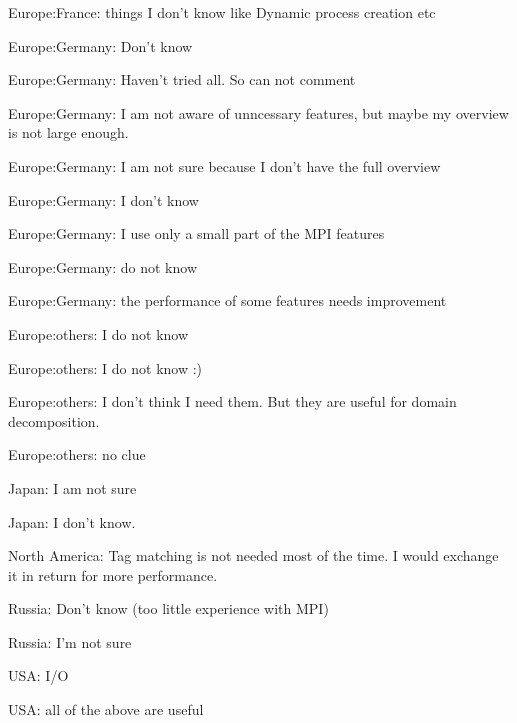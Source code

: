\item Europe:France: things I don't know like Dynamic process creation etc
\item Europe:Germany: Don't know
\item Europe:Germany: Haven't tried all. So can not comment
\item Europe:Germany: I am not aware of unncessary features, but maybe my overview is not large enough.
\item Europe:Germany: I am not sure because I don't have the full overview
\item Europe:Germany: I don't know
\item Europe:Germany: I use only a small part of the MPI features
\item Europe:Germany: do not know
\item Europe:Germany: the performance of some features needs improvement
\item Europe:others: I do not know
\item Europe:others: I do not know :)
\item Europe:others: I don't think I need them. But they are useful for domain decomposition.
\item Europe:others: no clue
\item Japan: I am not sure
\item Japan: I don't know.
\item North America: Tag matching is not needed most of the time. I would exchange it in return for more performance.
\item Russia: Don't know (too little experience with MPI)
\item Russia: I'm not sure
\item USA: I/O
\item USA: all of the above are useful
